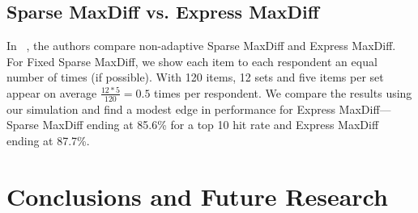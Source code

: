 \documentclass[a4paper,11pt]{article}
\begin{document}

\subsection{Sparse MaxDiff vs. Express MaxDiff}
In ~\cite{wirth2012largeset}, the authors compare non-adaptive Sparse MaxDiff and Express MaxDiff. For Fixed Sparse MaxDiff, we show each item to each respondent an equal number of times (if possible). With 120 items, 12 sets and five items per set appear on average $\frac{12*5}{120} = 0.5$ times per respondent. We compare the results using our simulation and find a modest edge in performance for Express MaxDiff---Sparse MaxDiff ending at 85.6\% for a top 10 hit rate and Express MaxDiff ending at 87.7\%.

\section{Conclusions and Future Research}
\end{document}
